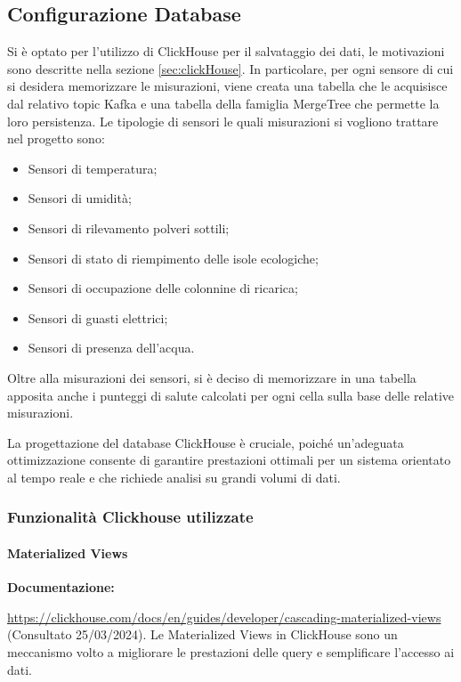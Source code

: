 \subsection{Configurazione Database}
Si è optato per l'utilizzo di ClickHouse per il salvataggio dei dati, le motivazioni sono descritte nella sezione \ref{sec:clickHouse}. In particolare, per ogni sensore di cui si desidera memorizzare le misurazioni, viene creata una tabella che le acquisisce dal relativo topic Kafka e una tabella della famiglia MergeTree che permette la loro persistenza.
Le tipologie di sensori le quali misurazioni si vogliono trattare nel progetto sono:
\begin{itemize}
    \item Sensori di temperatura;
    \item Sensori di umidità;
    \item Sensori di rilevamento polveri sottili; 
    \item Sensori di stato di riempimento delle isole ecologiche;
    \item Sensori di occupazione delle colonnine di ricarica;
    \item Sensori di guasti elettrici;
    \item Sensori di presenza dell'acqua.
\end{itemize}
Oltre alla misurazioni dei sensori, si è deciso di memorizzare in una tabella apposita anche i punteggi di salute calcolati per ogni cella sulla base delle relative misurazioni.

La progettazione del database ClickHouse è cruciale, poiché un'adeguata ottimizzazione consente di garantire prestazioni ottimali per un sistema orientato al tempo reale e che richiede analisi su grandi volumi di dati.

\subsubsection{Funzionalità Clickhouse utilizzate}
\paragraph{Materialized Views}
\textbf{Documentazione:}

\url{https://clickhouse.com/docs/en/guides/developer/cascading-materialized-views} (Consultato 25/03/2024).\newline
Le Materialized Views in ClickHouse sono un meccanismo volto a migliorare le prestazioni delle query e semplificare l'accesso ai dati.

